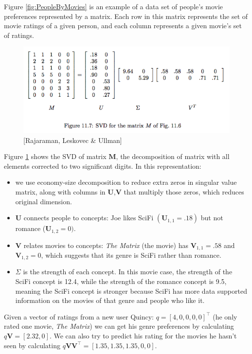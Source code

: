 \documentclass[a4paper]{article}
\begin{document}
Figure \ref{fig:PeopleByMovies} is an example of a data set of people's movie preferences represented by a matrix. Each row in this matrix represents the set of movie ratings of a given person, and each column represents a given movie's set of ratings.

\begin{figure}
\centering
\includegraphics[width=1.0\textwidth]{movies_SVD.png}
\caption{\label{fig:SVDMovies}[Rajaraman, Leskovec \& Ullman]}
\end{figure}

Figure \ref{fig:SVDMovies} shows the SVD of matrix $\mathbf{M}$, the decomposition of matrix with all elements corrected to two significant digits. In this representation:

\begin{itemize}
\item we use economy-size decomposition to reduce extra zeros in singular value matrix, along with columns in $\mathbf{U}$,$\mathbf{V}$ that multiply those zeros, which reduces original dimension.
\item $\mathbf{U}$ connects people to concepts: Joe likes SciFi $(\mathbf{U}_{1,1}=.18)$ but not romance ($\mathbf{U}_{1,2}=0)$. 
\item $\mathbf{V}$ relates movies to concepts: \emph{The Matrix} (the movie) has $\mathbf{V}_{1,1}=.58$ and $\mathbf{V}_{1,2}=0$, which suggests that its genre is SciFi rather than romance.
\item $\Sigma$ is the strength of each concept. In this movie case, the strength of the SciFi concept is 12.4, while the strength
of the romance concept is 9.5, meaning the SciFi concept is stronger
because SciFi has more data supported information  on the movies of that genre and people who like it.

\end{itemize}

Given a vector of ratings from a new user Quincy: $q=[4,0,0,0,0]^\top$ (he only rated one movie, \emph{The Matrix}) we can get his genre preferences by calculating $q\mathbf{V}=[2.32,0]$. We can also try to predict his rating for the movies he hasn't seen by calculating $q\mathbf{VV}^\top=[1.35,1.35,1.35,0,0]$.
\end{document}
